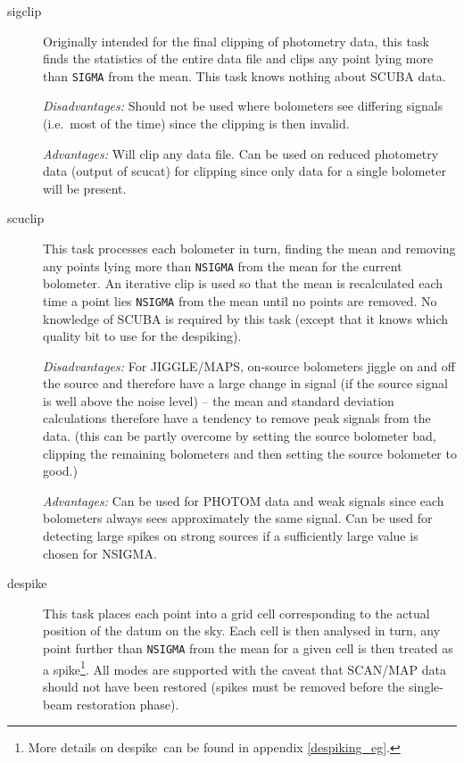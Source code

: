 \documentclass[twoside,11pt]{article}
\newcommand{\task}[1]{{\sf #1}}
\newcommand{\param}[1]{{\tt #1}}
\newcommand{\scucat}{\htmlref{\task{scucat}}{SCUCAT}}
\newcommand{\sigclip}{\htmlref{\task{sigclip}}{SIGCLIP}}
\newcommand{\despike}{\htmlref{\task{despike}}{DESPIKE}}
\newcommand{\scuclip}{\htmlref{\task{scuclip}}{SCUCLIP}}
\newcommand{\htmlref}[2]{#1}
\begin{document}
\begin{description}
\item[\sigclip] \mbox{}

Originally intended for the final clipping of photometry data, this task
finds the statistics of the entire data file and clips any point lying more
than \param{SIGMA} from the mean. This task knows nothing about SCUBA data.

\textit{Disadvantages:} Should not be used where bolometers see differing
signals (i.e.\ most of the time) since the clipping is then invalid.

\textit{Advantages:} Will clip any data file. Can be used on reduced
photometry data (output of \scucat) for clipping since only data for a single
bolometer will be present.

\item[\scuclip] \mbox{}

This task processes each bolometer in turn, finding the mean and removing any
points lying more than \param{NSIGMA} from the mean for the current bolometer.
An iterative clip is used so that the mean is recalculated each time a point
lies \param{NSIGMA} from the mean until no points are removed.
No knowledge of SCUBA is required by this task (except that it knows which 
quality bit to use for the despiking).

\textit{Disadvantages:} For JIGGLE/MAPS, on-source bolometers jiggle on and
off the source and therefore have a large change in signal (if the source
signal is well above the noise level) -- the mean and standard deviation
calculations therefore have a tendency to remove peak signals from the data.
(this can be partly overcome by setting the source bolometer bad, clipping the
remaining bolometers and then setting the source bolometer to good.)

\textit{Advantages:} Can be used for PHOTOM data and weak signals since
each bolometers always sees approximately the same signal. Can be used for
detecting large spikes on strong sources if a sufficiently large value is
chosen for NSIGMA.


\item[\despike] \mbox{}

This task places each point into a grid cell corresponding to the actual
position of the datum on the sky. Each cell is then analysed in turn, any
point further than \param{NSIGMA} from the mean for a given cell is then
treated as a spike\footnote{More details on \despike\ can be found in appendix
\ref{despiking_eg}.}.  All modes are supported with the caveat that SCAN/MAP
data should not have been restored (spikes must be removed before the
single-beam restoration phase).


\end{description}
\end{document}
